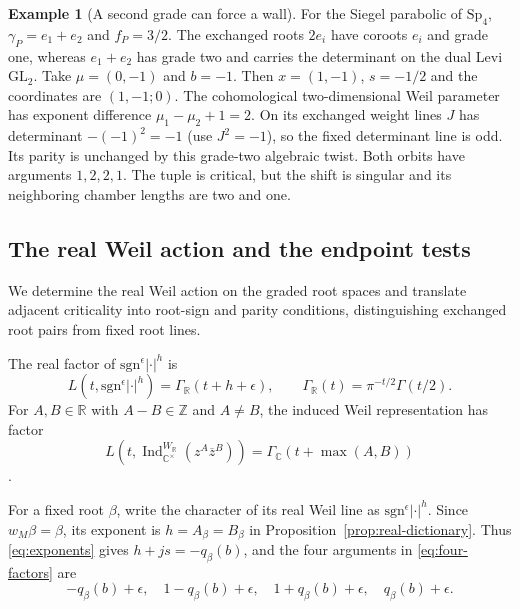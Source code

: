 \documentclass[12pt]{amsart}
\numberwithin{equation}{section}
\theoremstyle{plain}
\theoremstyle{definition}
\newtheorem{example}[theorem]{Example}
\theoremstyle{remark}
\renewcommand{\bar}{\overline}
\newcommand{\C}{\mathbb C}
\newcommand{\R}{\mathbb R}
\newcommand{\GL}{\mathrm{GL}}
\newcommand{\Sp}{\mathrm{Sp}}
\newcommand{\Z}{\mathbb{Z}}
\newcommand{\sgn}{\mathrm{sgn}}
\begin{document}
\begin{example}[A second grade can force a wall]\label{ex:sp4-wall}
For the Siegel parabolic of $\Sp_4$, $\gamma_P=e_1+e_2$ and $f_P=3/2$. The exchanged roots $2e_i$ have coroots $e_i$ and grade one, whereas $e_1+e_2$ has grade two and carries the determinant on the dual Levi $\GL_2$. Take $\mu=(0,-1)$ and $b=-1$. Then $x=(1,-1)$, $s=-1/2$ and the coordinates are $(1,-1;0)$. The cohomological two-dimensional Weil parameter has exponent difference $\mu_1-\mu_2+1=2$. On its exchanged weight lines $J$ has determinant $-(-1)^2=-1$ (use $J^2=-1$), so the fixed determinant line is odd. Its parity is unchanged by this grade-two algebraic twist. Both orbits have arguments $1,2,2,1$. The tuple is critical, but the shift is singular and its neighboring chamber lengths are two and one. 
\end{example}

\subsection{The real Weil action and the endpoint tests}\label{subsec:real-weil}
We determine the real Weil action on the graded root spaces and translate adjacent criticality into root-sign and parity conditions, distinguishing exchanged root pairs from fixed root lines.

The real factor of $\sgn^\epsilon|\cdot|^h$ is 
\begin{equation}\label{eq:real-factor}
 L(t,\sgn^\epsilon|\cdot|^h)=\Gamma_\R(t+h+\epsilon),\qquad
 \Gamma_\R(t)=\pi^{-t/2}\Gamma(t/2).
\end{equation}
For $A,B\in\R$ with $A-B\in\Z$ and $A\ne B$, the induced Weil representation has factor \begin{equation}\label{eq:complex-factor}
 L\!\left(t,\operatorname{Ind}_{\C^\times}^{W_\R}
                 (z^A\bar z^B)\right)=\Gamma_\C(t+\max(A,B))
\end{equation}
\cite[(3.6), p.~404]{Knapp1994}.

For a fixed root $\beta$, write the character of its real Weil line as $\sgn^\epsilon|\cdot|^h$. Since $w_M\beta=\beta$, its exponent is $h=A_\beta=B_\beta$ in Proposition~\ref{prop:real-dictionary}. Thus \eqref{eq:exponents} gives $h+js=-q_\beta(b)$, and the four arguments in \eqref{eq:four-factors} are 
\begin{equation}\label{eq:real-arguments}
 -q_\beta(b)+\epsilon,\quad 1-q_\beta(b)+\epsilon,\quad 1+q_\beta(b)+\epsilon,\quad q_\beta(b)+\epsilon.
\end{equation}
\end{document}
